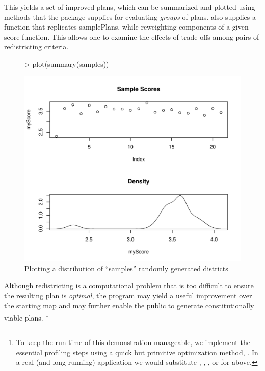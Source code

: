 \documentclass[article]{JSSstyle/jss}
\begin{document}
This yields a set of improved plans, which can be summarized and plotted using methods that the package supplies for evaluating \emph{groups} of plans.  also supplies a  function that replicates samplePlans, while reweighting components of a given score function. This allows one to examine the effects of trade-offs among pairs of redistricting criteria. 

  \begin{figure}[!h]
\begin{Schunk}
\begin{Sinput}
> plot(summary(samples))
\end{Sinput}
\end{Schunk}
\includegraphics{bardJSS-plot3a}
  \caption{\label{fig:rplot3} Plotting a distribution of ``samples'' randomly generated districts}
  \end{figure}
  
Although redistricting is a computational problem that is too difficult to ensure the resulting plan is \emph{optimal}, the program may yield a useful improvement over the starting map and may further enable the public to generate constitutionally viable plans. \footnote{To keep the run-time of this demonstration manageable, we implement the essential profiling steps  using a quick but primitive optimization method, .  In a real (and long running) application we would substitute , , , or  for  above.}  
\end{document}
